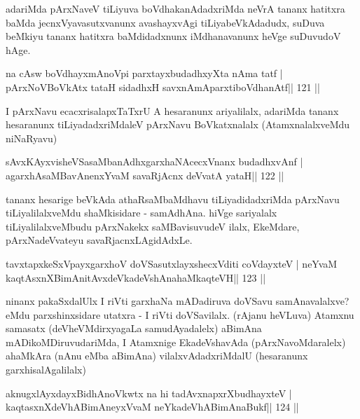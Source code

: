 \begin{artha}
adariMda pArxNaveV tiLiyuva boVdhakanAdadxriMda neVrA tananx hatitxra  baMda jecnxVyavasutxvanunx avashayxvAgi tiLiyabeVkAdadudx, suDuva beMkiyu tananx hatitxra baMdidadxnunx iMdhanavanunx heVge suDuvudoV hAge.
\end{artha}

\begin{shl}
na cAsw boVdhayxmAnoV\s pi parxtayxbudadhxyXta nAma tatf |
pArxNoV\s BoVkAtx tataH sidadhxH savxnAmAparxtiboVdhanAtf\hfill || 121 ||
\end{shl}

\begin{artha}
I pArxNavu ecacxrisalapxTaTxrU A hesaranunx ariyalilalx, adariMda tananx hesaranunx tiLiyadadxriMdaleV pArxNavu BoVkatxnalalx (AtamxnalalxveMdu niNaRyavu)
\end{artha}

\begin{shl}
sAvxKAyxvisheVSasaMbanAdhxgarxhaNAcecxVnanx budadhxvAnf |
agarxhAsaMBavAnenxYvaM savaRjAcnx deVvatA yataH\hfill || 122 ||
\end{shl}

\begin{artha}
tananx hesarige beVkAda athaRsaMbaMdhavu tiLiyadidadxriMda pArxNavu  tiLiyalilalxveMdu shaMkisidare - samAdhAna. hiVge sariyalalx  tiLiyalilalxveMbudu pArxNakekx saMBavisuvudeV ilalx, EkeMdare, pArxNadeVvateyu savaRjacnxLAgidAdxLe.
\end{artha}


\begin{shl}
tavxtapxkeSxV\s payxgarxhoV doVSasutxlayxshecxVditi coVdayxteV |
neYvaM kaqtAsxnXBimAnitAvxdeVkadeVshAnahaMkaqteVH\hfill || 123 ||
\end{shl}

\begin{artha}
ninanx pakaSxdalUlx I riVti garxhaNa mADadiruva doVSavu samAnavalalxve? eMdu parxshinxsidare utatxra - I riVti doVSavilalx. (rAjanu heVLuva) Atamxnu samasatx (deVheVMdirxyagaLa samudAyadalelx) aBimAna mADikoMDiruvudariMda, I Atamxnige EkadeVshavAda (pArxNavoMdaralelx) ahaMkAra (nAnu eMba aBimAna) vilalxvAdadxriMdalU (hesaranunx garxhisalAgalilalx) 
\end{artha} 


\begin{shl}
aknugxlAyxdayxBidhAnoVkwtx na hi tadAvxnapxrXbudhayxteV |
kaqtasxnXdeVhABimAneyxVvaM neYkadeVhABimAnaBukf\hfill || 124 ||
\end{shl}

